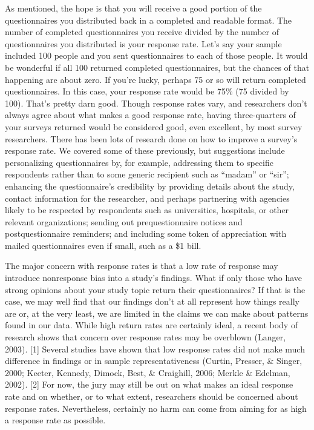 As mentioned, the hope is that you will receive a good portion of the questionnaires you distributed back in a completed and readable format. The number of completed questionnaires you receive divided by the number of questionnaires you distributed is your response rate. Let’s say your sample included 100 people and you sent questionnaires to each of those people. It would be wonderful if all 100 returned completed questionnaires, but the chances of that happening are about zero. If you’re lucky, perhaps 75 or so will return completed questionnaires. In this case, your response rate would be 75\% (75 divided by 100). That’s pretty darn good. Though response rates vary, and researchers don’t always agree about what makes a good response rate, having three-quarters of your surveys returned would be considered good, even excellent, by most survey researchers. There has been lots of research done on how to improve a survey’s response rate. We covered some of these previously, but suggestions include personalizing questionnaires by, for example, addressing them to specific respondents rather than to some generic recipient such as “madam” or “sir”; enhancing the questionnaire’s credibility by providing details about the study, contact information for the researcher, and perhaps partnering with agencies likely to be respected by respondents such as universities, hospitals, or other relevant organizations; sending out prequestionnaire notices and postquestionnaire reminders; and including some token of appreciation with mailed questionnaires even if small, such as a \$1 bill.

The major concern with response rates is that a low rate of response may introduce nonresponse bias into a study’s findings. What if only those who have strong opinions about your study topic return their questionnaires? If that is the case, we may well find that our findings don’t at all represent how things really are or, at the very least, we are limited in the claims we can make about patterns found in our data. While high return rates are certainly ideal, a recent body of research shows that concern over response rates may be overblown (Langer, 2003). [1] Several studies have shown that low response rates did not make much difference in findings or in sample representativeness (Curtin, Presser, \& Singer, 2000; Keeter, Kennedy, Dimock, Best, \& Craighill, 2006; Merkle \& Edelman, 2002). [2] For now, the jury may still be out on what makes an ideal response rate and on whether, or to what extent, researchers should be concerned about response rates. Nevertheless, certainly no harm can come from aiming for as high a response rate as possible.


